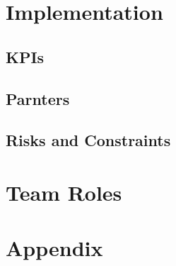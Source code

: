 \documentclass[10pt]{article}
\begin{document}
\section{Implementation}
\subsection{KPIs}
\subsection{Parnters}
\subsection{Risks and Constraints}

\section{Team Roles}

\section{Appendix}
\end{document}
